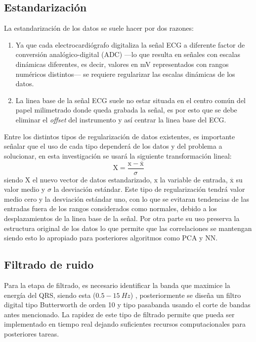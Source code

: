 \documentclass[12pt,letterpaper,oneside,openright]{book}
\begin{document}
\subsection{Estandarización}

La estandarización de los datos se suele hacer por dos razones:
\begin{enumerate}
	\item Ya que cada electrocardiógrafo digitaliza la señal ECG a diferente factor de conversión analógico-digital (ADC) ---lo que resulta en señales con escalas dinámicas diferentes, es decir, valores en mV representados con rangos numéricos distintos--- se requiere regularizar las escalas dinámicas de los datos.
	\item La linea base de la señal ECG suele no estar situada en el centro común del papel milimetrado donde queda grabada la señal, es por esto que se debe eliminar el \emph{offset} del instrumento y así centrar la linea base del ECG.
\end{enumerate}
Entre los distintos tipos de regularización de datos existentes, es importante señalar que el uso de cada tipo dependerá de los datos y del problema a solucionar, en esta investigación se usará la siguiente transformación lineal:
\begin{equation}
	\label{eq:normalizacion}
	\mathrm{X}=\frac{\mathrm{x}-\overline{\mathrm{x}}}{\sigma}
\end{equation}
siendo $\mathrm{X}$ el nuevo vector de datos estandarizado, $\mathrm{x}$ la variable de entrada, $\overline{\mathrm{x}}$ su valor medio y $\sigma$ la desviación estándar. Este tipo de regularización tendrá valor medio cero y la desviación estándar uno, con lo que se evitaran tendencias de las entradas fuera de los rangos considerados como normales, debido a los desplazamientos de la linea base de la señal. Por otra parte su uso preserva la estructura original de los datos lo que permite que las correlaciones se mantengan siendo esto lo apropiado para posteriores algoritmos como PCA y NN.
\subsection{Filtrado de ruido}

Para la etapa de filtrado, es necesario identificar la banda que maximice la energía del QRS, siendo esta ($0.5 - 15 \ Hz$) \cite{PanTompkins85}, posteriormente se diseña un filtro digital tipo Butterworth de orden 10 y tipo pasabanda usando el corte de bandas antes mencionado. La rapidez de este tipo de filtrado permite que pueda ser implementado en tiempo real dejando suficientes recursos computacionales para posteriores tareas. 
\end{document}

